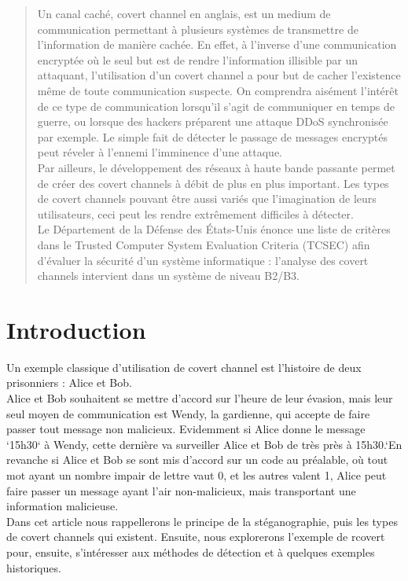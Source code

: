\documentclass{acm_proc_article-sp}
\begin{document}
\maketitle
\begin{abstract}
    Un canal caché, covert channel en anglais, est un medium de communication permettant à plusieurs systèmes de transmettre de l'information de manière cachée.
    En effet, à l'inverse d'une communication encryptée où le seul but est de rendre l'information illisible par un attaquant, l'utilisation d'un covert channel a pour but de cacher l'existence même de toute communication suspecte. On comprendra aisément l'intérêt de ce type de communication lorsqu'il s'agit de communiquer en temps de guerre, ou lorsque des hackers préparent une attaque DDoS synchronisée par exemple. Le simple fait de détecter le passage de messages encryptés peut réveler à l'ennemi l'imminence d'une attaque.\\
    Par ailleurs, le développement des réseaux à haute bande passante permet de créer des covert channels à débit de plus en plus important.
    Les types de covert channels pouvant être aussi variés que l'imagination de leurs utilisateurs, ceci peut les rendre extrêmement difficiles à détecter.\\
    Le Département de la Défense des États-Unis énonce une liste de critères dans le Trusted Computer System Evaluation Criteria (TCSEC) afin d'évaluer la sécurité d'un système informatique : l'analyse des covert channels intervient dans un système de niveau B2/B3.
\end{abstract}



\section{Introduction}
Un exemple classique d'utilisation de covert channel est l'histoire de deux prisonniers : Alice et Bob.\\
Alice et Bob souhaitent se mettre d'accord sur l'heure de leur évasion, mais leur seul moyen de communication est Wendy, la gardienne, qui accepte de faire passer tout message non malicieux. Evidemment si Alice donne le message `15h30` à Wendy, cette dernière va surveiller Alice et Bob de très près à 15h30.`En revanche si Alice et Bob se sont mis d'accord sur un code au préalable, où tout mot ayant un nombre impair de lettre vaut 0, et les autres valent 1, Alice peut faire passer un message ayant l'air non-malicieux, mais transportant une information malicieuse.\\
Dans cet article nous rappellerons le principe de la stéganographie, puis les types de covert channels qui existent. Ensuite, nous explorerons l'exemple de rcovert pour, ensuite, s'intéresser aux méthodes de détection et à quelques exemples historiques.
\end{document}
